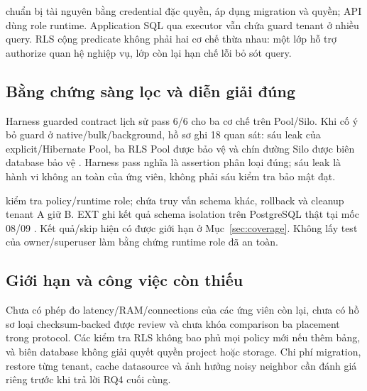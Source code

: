  chuẩn bị tài nguyên bằng credential đặc quyền, áp dụng migration và quyền; API dùng role runtime. Application SQL qua executor vẫn chứa guard tenant ở nhiều query. RLS cộng predicate không phải hai cơ chế thừa nhau: một lớp hỗ trợ authorize quan hệ nghiệp vụ, lớp còn lại hạn chế lỗi bỏ sót query.

\subsection{Bằng chứng sàng lọc và diễn giải đúng}
Harness guarded contract lịch sử pass 6\slash 6 cho ba cơ chế trên Pool\slash Silo. Khi cố ý bỏ guard ở native\slash bulk\slash background, hồ sơ ghi 18 quan sát: sáu leak của explicit\slash Hibernate Pool, ba RLS Pool được bảo vệ và chín đường Silo được biên database bảo vệ . Harness pass nghĩa là assertion phân loại đúng; sáu leak là hành vi không an toàn của ứng viên, không phải sáu kiểm tra bảo mật đạt.

 kiểm tra policy\slash runtime role;  chứa truy vấn schema khác, rollback và cleanup tenant A giữ B. EXT ghi kết quả schema isolation trên PostgreSQL thật tại mốc 08\slash 09 . Kết quả\slash skip hiện có được giới hạn ở Mục~\ref{sec:coverage}. Không lấy test của owner\slash superuser làm bằng chứng runtime role đã an toàn.

\subsection{Giới hạn và công việc còn thiếu}
Chưa có phép đo latency\slash RAM\slash connections của các ứng viên còn lại, chưa có hồ sơ loại checksum-backed được review và chưa khóa comparison ba placement trong protocol. Các kiểm tra RLS không bao phủ mọi policy mới nếu thêm bảng, và biên database không giải quyết quyền project hoặc storage. Chi phí migration, restore từng tenant, cache datasource và ảnh hưởng noisy neighbor cần đánh giá riêng trước khi trả lời RQ4 cuối cùng.
